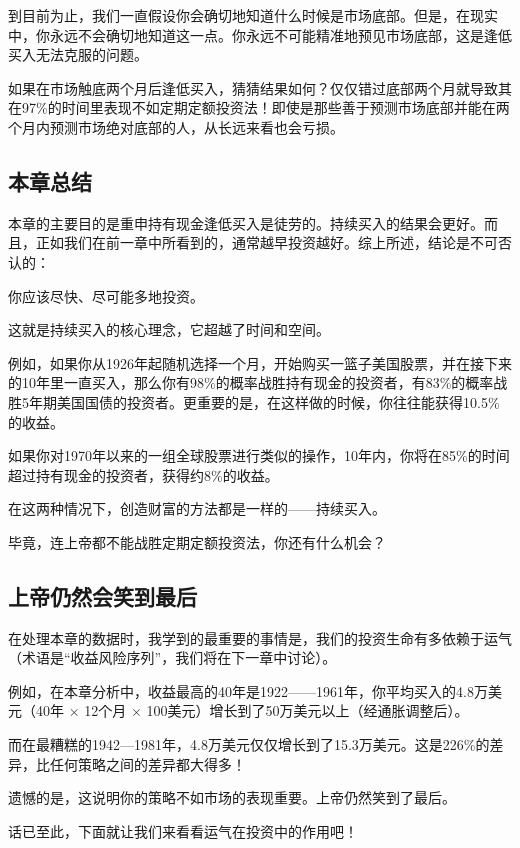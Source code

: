 到目前为止，我们一直假设你会确切地知道什么时候是市场底部。但是，在现实中，你永远不会确切地知道这一点。你永远不可能精准地预见市场底部，这是逢低买入无法克服的问题。

如果在市场触底两个月后逢低买入，猜猜结果如何？仅仅错过底部两个月就导致其在97\%的时间里表现不如定期定额投资法！即使是那些善于预测市场底部并能在两个月内预测市场绝对底部的人，从长远来看也会亏损。

\subsection{本章总结}
本章的主要目的是重申持有现金逢低买入是徒劳的。持续买入的结果会更好。而且，正如我们在前一章中所看到的，通常越早投资越好。综上所述，结论是不可否认的：

你应该尽快、尽可能多地投资。

这就是持续买入的核心理念，它超越了时间和空间。

例如，如果你从1926年起随机选择一个月，开始购买一篮子美国股票，并在接下来的10年里一直买入，那么你有98\%的概率战胜持有现金的投资者，有83\%的概率战胜5年期美国国债的投资者。更重要的是，在这样做的时候，你往往能获得10.5\%的收益。

如果你对1970年以来的一组全球股票进行类似的操作，10年内，你将在85\%的时间超过持有现金的投资者，获得约8\%的收益。

在这两种情况下，创造财富的方法都是一样的——持续买入。

毕竟，连上帝都不能战胜定期定额投资法，你还有什么机会？

\subsection{上帝仍然会笑到最后}
在处理本章的数据时，我学到的最重要的事情是，我们的投资生命有多依赖于运气（术语是“收益风险序列”，我们将在下一章中讨论）。

例如，在本章分析中，收益最高的40年是1922——1961年，你平均买入的4.8万美元（40年 $\times$ 12个月 $\times$ 100美元）增长到了50万美元以上（经通胀调整后）。

而在最糟糕的1942—1981年，4.8万美元仅仅增长到了15.3万美元。这是226\%的差异，比任何策略之间的差异都大得多！

遗憾的是，这说明你的策略不如市场的表现重要。上帝仍然笑到了最后。

话已至此，下面就让我们来看看运气在投资中的作用吧！
